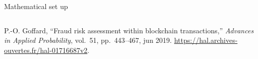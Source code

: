 \documentclass{beamer}
\begin{document}
\begin{frame}{Mathematical set up}
\begin{columns}
\begin{column}{0.5\textwidth}
\end{column}
\end{columns}

\tiny
\begin{thebibliography}{1}

P.-O. Goffard, ``Fraud risk assessment within blockchain transactions,'' {\em
  Advances in Applied Probability}, vol.~51, pp.~443--467, jun 2019.
\newblock \url{https://hal.archives-ouvertes.fr/hal-01716687v2}.

\end{thebibliography}

\end{frame}
\end{document}

